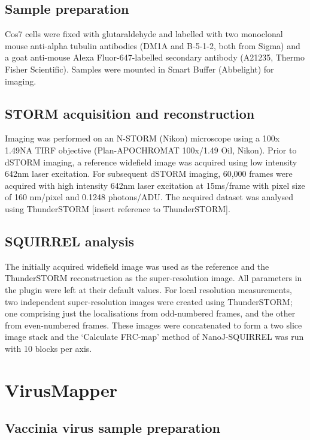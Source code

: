 \subsection{Sample preparation}

Cos7 cells were fixed with glutaraldehyde and labelled with two monoclonal mouse anti-alpha tubulin antibodies (DM1A and B-5-1-2, both from Sigma) and a goat anti-mouse Alexa Fluor-647-labelled secondary antibody (A21235, Thermo Fisher Scientific). Samples were mounted in Smart Buffer (Abbelight) for imaging.

\subsection{STORM acquisition and reconstruction}

Imaging was performed on an N-STORM (Nikon) microscope using a 100x 1.49NA TIRF objective (Plan-APOCHROMAT 100x/1.49 Oil, Nikon). Prior to dSTORM imaging, a reference widefield image was acquired using low intensity 642nm laser excitation. For subsequent dSTORM imaging, 60,000 frames were acquired with high intensity 642nm laser excitation at 15ms/frame with pixel size of 160 nm/pixel and 0.1248 photons/ADU. The acquired dataset was analysed using ThunderSTORM [insert reference to ThunderSTORM].

\subsection{SQUIRREL analysis}

The initially acquired widefield image was used as the reference and the ThunderSTORM reconstruction as the super-resolution image. All parameters in the plugin were left at their default values. For local resolution measurements, two independent super-resolution images were created using ThunderSTORM; one comprising just the localisations from odd-numbered frames, and the other from even-numbered frames. These images were concatenated to form a two slice image stack and the ‘Calculate FRC-map’ method of NanoJ-SQUIRREL was run with 10 blocks per axis.


\section{VirusMapper}

\subsection{Vaccinia virus sample preparation}
 
